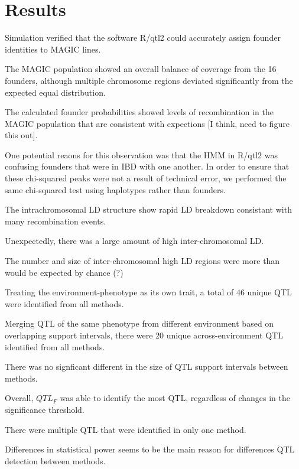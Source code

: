 \documentclass[article,9pt,twocolumn,twoside]{rilabRxiv}
\begin{document}
\section{Results}

Simulation verified that the software R/qtl2 could accurately assign founder identities to MAGIC lines.

The MAGIC population showed an overall balance of coverage from the 16 founders, although multiple chromosome regions deviated significantly from the expected equal distribution.

The calculated founder probabilities showed levels of recombination in the MAGIC population that are consistent with expections [I think, need to figure this out].

One potential reaons for this observation was that the HMM in R/qtl2 was confusing founders that were in IBD with one another. In order to ensure that these chi-squared peaks were not a result of technical error, we performed the same chi-squared test using haplotypes rather than founders.

The intrachromosomal LD structure show rapid LD breakdown consistant with many recombination events.

Unexpectedly, there was a large amount of high inter-chromosomal LD.

The number and size of inter-chromosomal high LD regions were more than would be expected by chance (?)


Treating the environment-phenotype as its own trait, a total of 46 unique QTL were identified from all methods.

Merging QTL of the same phenotype from different environment based on overlapping support intervals, there were 20 unique across-environment QTL identified from all methods.

There was no signficant different in the size of QTL support intervals between methods.

Overall, $QTL_F$ was able to identify the most QTL, regardless of changes in the significance threshold.

There were multiple QTL that were identified in only one method.

Differences in statistical power seems to be the main reason for differences QTL detection between methods.
\end{document}
